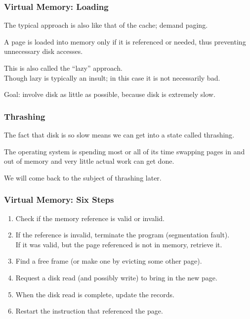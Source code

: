 \begin{frame}
\frametitle{Virtual Memory: Loading}

The typical approach is also like that of the cache; demand paging. 

A page is loaded into memory only if it is referenced or needed, thus preventing unnecessary disk accesses. 

This is also called the ``lazy'' approach.\\
\quad Though lazy is typically an insult; in this case it is not necessarily bad.  

Goal: involve disk as little as possible, because disk is extremely slow.


\end{frame}

\begin{frame}
\frametitle{Thrashing}

The fact that disk is so slow means we can get into a state called \alert{thrashing}. 

The operating system is spending most or all of its time swapping pages in and out of memory and very little actual work can get done.

We will come back to the subject of thrashing later.

\end{frame}

\begin{frame}
\frametitle{Virtual Memory: Six Steps}

\begin{enumerate}
	\item Check if the memory reference is valid or invalid.
	\item If the reference is invalid, terminate the program (segmentation fault).\\
	 If it was valid, but the page referenced is not in memory, retrieve it.
	\item Find a free frame (or make one by evicting some other page).
	\item Request a disk read (and possibly write) to bring in the new page.
	\item When the disk read is complete, update the records.
	\item Restart the instruction that referenced the page.
\end{enumerate}


\end{frame}


